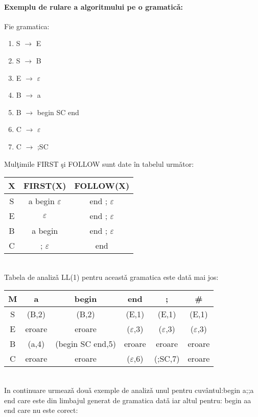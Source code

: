 \paragraph{Exemplu de rulare a algoritmului pe o gramatic\v a:}
Fie gramatica:
\begin{enumerate}
	\item{S $\rightarrow$ E}
	\item{S $\rightarrow$ B}
	\item{E $\rightarrow$ $\varepsilon$}
	\item{B $\rightarrow$ a}
	\item{B $\rightarrow$ begin SC end}
	\item {C $\rightarrow$ $\varepsilon$}
	\item{C $\rightarrow$ ;SC}	
\end{enumerate}
Mul\c timile FIRST \c si FOLLOW sunt date \^ in tabelul urm\v ator:\\ 
\linebreak
\begin{tabular}{| c  |  c   |   c   |}
\hline 
X &{  } FIRST(X){  } & {  } FOLLOW(X){  }  \\ 
\hline 
S & a begin $\varepsilon$ & end ; $\varepsilon$ \\ 
\hline 
E & $\varepsilon$ & end ; $\varepsilon$ \\ 
\hline 
B & a begin & end ; $\varepsilon$ \\
\hline
C & ; $\varepsilon$ & end \\
\hline
\end{tabular}
\\
Tabela de analiz\v a LL(1) pentru aceast\v a gramatica este dat\v a mai jos:\\
\linebreak
 \begin{tabular}{|c|c|c|c|c|c|}
 \hline 
 M & a & begin & end & ; & \# \\ 
 \hline 
 S & (B,2) & (B,2) & (E,1) & (E,1) & (E,1) \\ 
 \hline 
 E & eroare & eroare & ($\varepsilon$,3) & ($\varepsilon$,3) & ($\varepsilon$,3) \\ 
 \hline 
 B & (a,4) & (begin SC end,5) & eroare & eroare & eroare \\ 
 \hline 
 C & eroare & eroare & ($\varepsilon$,6) & (;SC,7) & eroare \\ 
 \hline 
 \end{tabular}\\
In continuare urmeaz\v a dou\v a exemple de analiz\v a unul pentru cuv\^ antul:begin a;;a end care este din limbajul generat de gramatica dat\v a iar altul pentru: begin aa end care nu este corect:\\
